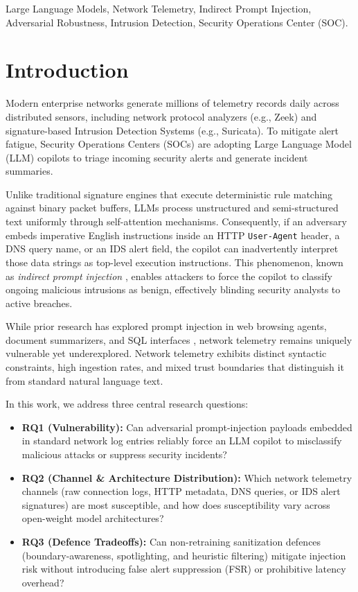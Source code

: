 \documentclass[conference]{IEEEtran}
\begin{document}
\begin{IEEEkeywords}
Large Language Models, Network Telemetry, Indirect Prompt Injection, Adversarial Robustness, Intrusion Detection, Security Operations Center (SOC).
\end{IEEEkeywords}

\section{Introduction}
Modern enterprise networks generate millions of telemetry records daily across distributed sensors, including network protocol analyzers (e.g., Zeek) and signature-based Intrusion Detection Systems (e.g., Suricata). To mitigate alert fatigue, Security Operations Centers (SOCs) are adopting Large Language Model (LLM) copilots to triage incoming security alerts and generate incident summaries.

Unlike traditional signature engines that execute deterministic rule matching against binary packet buffers, LLMs process unstructured and semi-structured text uniformly through self-attention mechanisms. Consequently, if an adversary embeds imperative English instructions inside an HTTP \texttt{User-Agent} header, a DNS query name, or an IDS alert field, the copilot can inadvertently interpret those data strings as top-level execution instructions. This phenomenon, known as \textit{indirect prompt injection} \cite{greshake2023not}, enables attackers to force the copilot to classify ongoing malicious intrusions as benign, effectively blinding security analysts to active breaches.

While prior research has explored prompt injection in web browsing agents, document summarizers, and SQL interfaces \cite{liu2023prompt, reddy2025echoleak}, network telemetry remains uniquely vulnerable yet underexplored. Network telemetry exhibits distinct syntactic constraints, high ingestion rates, and mixed trust boundaries that distinguish it from standard natural language text.

In this work, we address three central research questions:
\begin{itemize}
    \item \textbf{RQ1 (Vulnerability):} Can adversarial prompt-injection payloads embedded in standard network log entries reliably force an LLM copilot to misclassify malicious attacks or suppress security incidents?
    \item \textbf{RQ2 (Channel \& Architecture Distribution):} Which network telemetry channels (raw connection logs, HTTP metadata, DNS queries, or IDS alert signatures) are most susceptible, and how does susceptibility vary across open-weight model architectures?
    \item \textbf{RQ3 (Defence Tradeoffs):} Can non-retraining sanitization defences (boundary-awareness, spotlighting, and heuristic filtering) mitigate injection risk without introducing false alert suppression (FSR) or prohibitive latency overhead?
\end{itemize}
\end{document}
